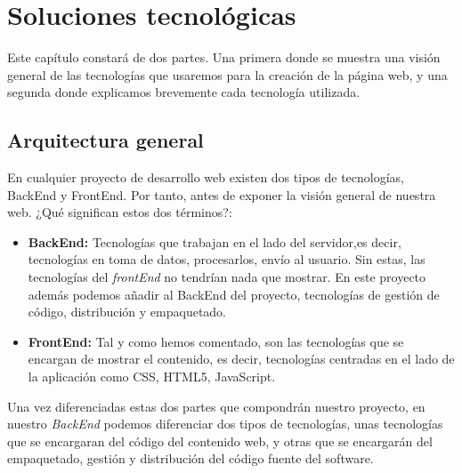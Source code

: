 \chapter{Soluciones tecnológicas}
\label{chap:Arqui}
Este capítulo constará de dos partes. Una primera donde se muestra una visión general de las tecnologías que usaremos para la creación de la página web, y una segunda donde explicamos brevemente cada tecnología utilizada.

\section{Arquitectura general}
\label{sec:arqui}
En cualquier proyecto de desarrollo web existen dos tipos de tecnologías, BackEnd y FrontEnd. Por tanto, antes de exponer la visión general de nuestra web. ¿Qué significan estos dos términos?:
\begin{itemize}
    \item \textbf{BackEnd:} Tecnologías que trabajan en el lado del servidor,es decir, tecnologías en toma de datos, procesarlos, envío al usuario. Sin estas, las tecnologías del \emph{frontEnd} no tendrían nada que mostrar. En este proyecto además podemos añadir al BackEnd del proyecto, tecnologías de gestión de código, distribución y empaquetado. 
    \item \textbf{FrontEnd:} Tal y como hemos comentado, son las tecnologías que se encargan de mostrar el contenido, es decir, tecnologías centradas en el lado de la aplicación como CSS, HTML5, JavaScript.
\end{itemize}
Una vez diferenciadas estas dos partes que compondrán nuestro proyecto, en nuestro \emph{BackEnd} podemos diferenciar dos tipos de tecnologías, unas tecnologías que se encargaran del código del contenido web, y otras que se encargarán del empaquetado, gestión y distribución del código fuente del software. \\ 

